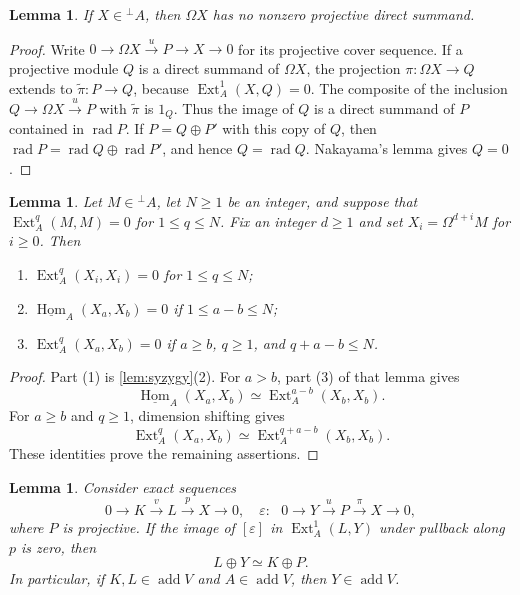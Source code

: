 \documentclass[a4paper,reqno]{amsart}
\numberwithin{equation}{section}
\newtheorem{lem}[thm]{Lemma}
\theoremstyle{definition}
\DeclareMathOperator{\Ext}{Ext}
\DeclareMathOperator{\Hom}{Hom}
\DeclareMathOperator{\add}{add}
\DeclareMathOperator{\rad}{rad}
\newcommand{\stHom}{\underline{\Hom}}
\newcommand{\perpA}{{}^{\perp}A}
\begin{document}
\begin{lem}\label{lem:no-proj-summand}
If $X\in\perpA$, then $\Omega X$ has no nonzero projective direct summand.
\end{lem}

\begin{proof}
Write $0\to\Omega X\xrightarrow{u}P\to X\to0$ for its projective cover sequence. If a projective module $Q$ is a direct summand of $\Omega X$, the projection $\pi:\Omega X\to Q$ extends to $\widetilde\pi:P\to Q$, because $\Ext_A^1(X,Q)=0$. The composite of the inclusion $Q\to\Omega X\xrightarrow{u}P$ with $\widetilde\pi$ is $1_Q$. Thus the image of $Q$ is a direct summand of $P$ contained in $\rad P$. If $P=Q\oplus P'$ with this copy of $Q$, then $\rad P=\rad Q\oplus\rad P'$, and hence $Q=\rad Q$. Nakayama's lemma gives $Q=0$.
\end{proof}

\begin{samepage}
\begin{lem}\label{lem:finite-range}
Let $M\in\perpA$, let $N\geq1$ be an integer, and suppose that $\Ext_A^q(M,M)=0$ for $1\leq q\leq N$. Fix an integer $d\geq1$ and set $X_i=\Omega^{d+i}M$ for $i\geq0$. Then
\begin{enumerate}
\item $\Ext_A^q(X_i,X_i)=0$ for $1\leq q\leq N$;
\item $\stHom_A(X_a,X_b)=0$ if $1\leq a-b\leq N$;
\item $\Ext_A^q(X_a,X_b)=0$ if $a\geq b$, $q\geq1$, and $q+a-b\leq N$.
\end{enumerate}
\end{lem}
\end{samepage}

\begin{proof}
Part (1) is \cref{lem:syzygy}(2). For $a>b$, part (3) of that lemma gives
\[
\stHom_A(X_a,X_b)\simeq\Ext_A^{a-b}(X_b,X_b).
\]
For $a\geq b$ and $q\geq1$, dimension shifting gives
\[
\Ext_A^q(X_a,X_b)\simeq\Ext_A^{q+a-b}(X_b,X_b).
\]
These identities prove the remaining assertions.
\end{proof}

\begin{lem}\label{lem:pullback}
Consider exact sequences
\[
0\longrightarrow K\xrightarrow{v}L\xrightarrow{p}X\longrightarrow0,
\quad
\varepsilon\colon~~~0\longrightarrow Y\xrightarrow{u}P\xrightarrow{\pi}X\longrightarrow0,
\]
where $P$ is projective. If the image of $[\varepsilon]$ in $\Ext_A^1(L,Y)$ under pullback along $p$ is zero, then
\[
L\oplus Y\simeq K\oplus P.
\]
In particular, if $K,L\in\add V$ and $A\in\add V$, then $Y\in\add V$.
\end{lem}
\end{document}
